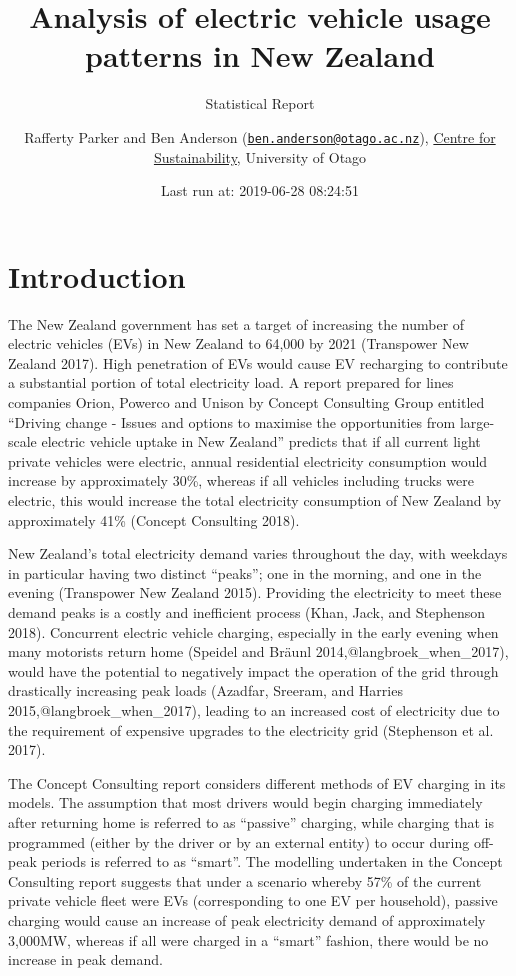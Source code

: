 \documentclass[]{article}
\title{Analysis of electric vehicle usage patterns in New Zealand}
\subtitle{Statistical Report}
\author{Rafferty Parker and Ben Anderson (\href{mailto:ben.anderson@otago.ac.nz}{\nolinkurl{ben.anderson@otago.ac.nz}}), \href{https://www.otago.ac.nz/centre-sustainability/}{Centre for Sustainability}, University of Otago}
\date{Last run at: 2019-06-28 08:24:51}
\begin{document}
\maketitle

{
\setcounter{tocdepth}{2}
\tableofcontents
}
\hypertarget{introduction}{%
\section{Introduction}\label{introduction}}

The New Zealand government has set a target of increasing the number of electric vehicles (EVs) in New Zealand to 64,000 by 2021 (Transpower New Zealand 2017). High penetration of EVs would cause EV recharging to contribute a substantial portion of total electricity load. A report prepared for lines companies Orion, Powerco and Unison by Concept Consulting Group entitled ``Driving change - Issues and options to maximise the opportunities from large-scale electric vehicle uptake in New Zealand'' predicts that if all current light private vehicles were electric, annual residential electricity consumption would increase by approximately 30\%, whereas if all vehicles including trucks were electric, this would increase the total electricity consumption of New Zealand by approximately 41\% (Concept Consulting 2018).

New Zealand's total electricity demand varies throughout the day, with weekdays in particular having two distinct ``peaks''; one in the morning, and one in the evening (Transpower New Zealand 2015). Providing the electricity to meet these demand peaks is a costly and inefficient process (Khan, Jack, and Stephenson 2018). Concurrent electric vehicle charging, especially in the early evening when many motorists return home (Speidel and Bräunl 2014,@langbroek\_when\_2017), would have the potential to negatively impact the operation of the grid through drastically increasing peak loads (Azadfar, Sreeram, and Harries 2015,@langbroek\_when\_2017), leading to an increased cost of electricity due to the requirement of expensive upgrades to the electricity grid (Stephenson et al. 2017).

The Concept Consulting report considers different methods of EV charging in its models. The assumption that most drivers would begin charging immediately after returning home is referred to as ``passive'' charging, while charging that is programmed (either by the driver or by an external entity) to occur during off-peak periods is referred to as ``smart''. The modelling undertaken in the Concept Consulting report suggests that under a scenario whereby 57\% of the current private vehicle fleet were EVs (corresponding to one EV per household), passive charging would cause an increase of peak electricity demand of approximately 3,000MW, whereas if all were charged in a ``smart'' fashion, there would be no increase in peak demand.
\end{document}
